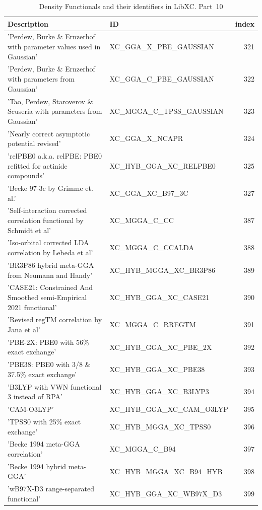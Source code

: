 \documentclass[final,12pt]{article}
\begin{document}
{{{{{{\begin{table}[!h]
\caption{Density Functionals and their identifiers in LibXC. Part~10}
\begin{center}
\begin{tabular}{llr}
\hline
\hline
Description & ID & index\\
\hline
  'Perdew, Burke \& Ernzerhof with parameter values used in Gaussian' & XC\_GGA\_X\_PBE\_GAUSSIAN  &321\\
  'Perdew, Burke \& Ernzerhof with parameters from Gaussian' & XC\_GGA\_C\_PBE\_GAUSSIAN  &322\\
  'Tao, Perdew, Staroverov \& Scuseria with parameters from Gaussian' & XC\_MGGA\_C\_TPSS\_GAUSSIAN  &323\\
  'Nearly correct asymptotic potential revised' & XC\_GGA\_X\_NCAPR  &324\\
  'relPBE0 a.k.a. relPBE: PBE0 refitted for actinide compounds' & XC\_HYB\_GGA\_XC\_RELPBE0  &325\\
  'Becke 97-3c by Grimme et. al.' & XC\_GGA\_XC\_B97\_3C  &327\\
  'Self-interaction corrected correlation functional by Schmidt et al' & XC\_MGGA\_C\_CC  &387\\
  'Iso-orbital corrected LDA correlation by Lebeda et al' & XC\_MGGA\_C\_CCALDA  &388\\
  'BR3P86 hybrid meta-GGA from Neumann and Handy' & XC\_HYB\_MGGA\_XC\_BR3P86  &389\\
  'CASE21: Constrained And Smoothed semi-Empirical 2021 functional' & XC\_HYB\_GGA\_XC\_CASE21  &390\\
  'Revised regTM correlation by Jana et al' & XC\_MGGA\_C\_RREGTM  &391\\
  'PBE-2X: PBE0 with 56\% exact exchange' & XC\_HYB\_GGA\_XC\_PBE\_2X  &392\\
  'PBE38: PBE0 with 3/8 \& 37.5\% exact exchange' & XC\_HYB\_GGA\_XC\_PBE38  &393\\
  'B3LYP with VWN functional 3 instead of RPA' & XC\_HYB\_GGA\_XC\_B3LYP3  &394\\
  'CAM-O3LYP' & XC\_HYB\_GGA\_XC\_CAM\_O3LYP  &395\\
  'TPSS0 with 25\% exact exchange' & XC\_HYB\_MGGA\_XC\_TPSS0  &396\\
  'Becke 1994 meta-GGA correlation' & XC\_MGGA\_C\_B94  &397\\
  'Becke 1994 hybrid meta-GGA' & XC\_HYB\_MGGA\_XC\_B94\_HYB  &398\\
  'wB97X-D3 range-separated functional' & XC\_HYB\_GGA\_XC\_WB97X\_D3  &399\\

\end{tabular}
\end{center}
\end{table}}}}}}}
\end{document}
